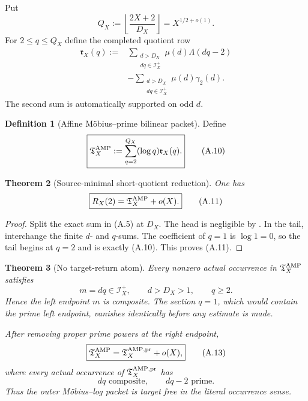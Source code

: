 \documentclass[11pt]{article}
\newtheorem{theorem}{Theorem}[section]
\theoremstyle{definition}
\newtheorem{definition}[theorem]{Definition}
\theoremstyle{remark}
\begin{document}
Put
\[
 Q_X:=\left\lfloor\frac{2X+2}{D_X}\right\rfloor
 =X^{1/2+o(1)}.
\]
For $2\le q\le Q_X$ define the completed quotient row
\begin{equation}
 \label{eq:affouter-quotient-row}
 \boxed{
 \begin{aligned}
 \mathfrak r_X(q)
 :={}&
 \sum_{\substack{d>D_X\\dq\in\mathscr I_X^+}}
 \mu(d)\Lambda(dq-2)
 \\
 &-
 \sum_{\substack{d>D_X\\dq\in\mathscr I_X^+}}
 \mu(d)\gamma_2(d).
 \end{aligned}}
 \tag{A.9}
\end{equation}
The second sum is automatically supported on odd $d$.

\begin{definition}[Affine M\"obius--prime bilinear packet]
\label{def:affouter-AMP-packet}
Define
\begin{equation}
 \label{eq:affouter-AMP-packet}
 \boxed{
 \mathfrak T_X^{\rm AMP}
 :=\sum_{q=2}^{Q_X}(\log q)\mathfrak r_X(q).}
 \tag{A.10}
\end{equation}
\end{definition}

\begin{theorem}[Source-minimal short-quotient reduction]
\label{thm:affouter-tail-reduction}
One has
\begin{equation}
 \label{eq:affouter-tail-reduction}
 \boxed{
 R_X(2)=\mathfrak T_X^{\rm AMP}+o(X).}
 \tag{A.11}
\end{equation}
\end{theorem}

\begin{proof}
Split the exact sum in \textup{(A.5)} at $D_X$.  The head is negligible by
.  In the tail, interchange the finite $d$- and
$q$-sums.  The coefficient of $q=1$ is $\log1=0$, so the tail begins at
$q=2$ and is exactly \textup{(A.10)}.  This proves \textup{(A.11)}.\end{proof}

\begin{theorem}[No target-return atom]
\label{thm:affouter-no-target-return}
Every nonzero actual occurrence in $\mathfrak T_X^{\rm AMP}$ satisfies
\[
 m=dq\in\mathscr I_X^+,
 \qquad d>D_X>1,
 \qquad q\ge2.
\]
Hence the left endpoint $m$ is composite.  The section $q=1$, which would
contain the prime left endpoint, vanishes identically before any estimate is
made.

After removing proper prime powers at the right endpoint,
\begin{equation}
 \label{eq:affouter-prime-cleanup}
 \boxed{
 \mathfrak T_X^{\rm AMP}
 =\mathfrak T_X^{\rm AMP,pr}+o(X),}
 \tag{A.13}
\end{equation}
where every actual occurrence of
$\mathfrak T_X^{\rm AMP,pr}$ has
\[
 dq\text{ composite},
 \qquad dq-2\text{ prime}.
\]
Thus the outer M\"obius--log packet is target free in the literal occurrence sense.
\end{theorem}
\end{document}
